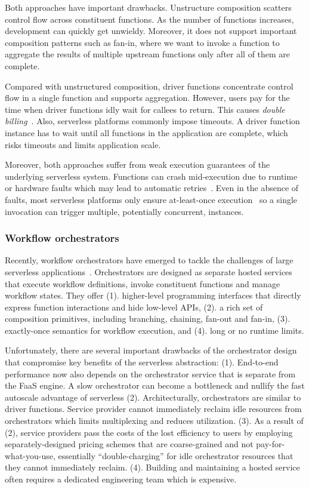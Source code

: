 Both approaches have important drawbacks. Unstructure composition scatters
control flow across constituent functions. As the number of functions
increases, development can quickly get unwieldy. Moreover, it does not support
important composition patterns such as fan-in, where we want to invoke a
function to aggregate the results of multiple upstream functions only after
all of them are complete.

Compared with unstructured composition, driver functions concentrate control
flow in a single function and supports aggregation. However, users pay for the
time when driver functions idly wait for callees to return. This causes
\emph{double billing}~\cite{double-billing}. Also, serverless platforms
commonly impose timeouts. A driver function instance has to wait until all
functions in the application are complete, which risks timeouts and limits
application scale.

Moreover, both approaches suffer from weak execution guarantees of the
underlying serverless system. Functions can crash mid-execution due to runtime
or hardware faults which may lead to automatic retries~\cite{}. Even in the
absence of faults, most serverless platforms only ensure at-least-once
execution~\cite{} so a single invocation can trigger multiple, potentially
concurrent, instances.

\subsubsection{Workflow orchestrators}

Recently, workflow orchestrators have emerged to tackle the challenges of
large serverless applications~\cite{excamera, gg-atc, aws-step-functions,
google-cloud-composer, google-workflows, durable-functions}. Orchestrators are
designed as separate hosted services that execute workflow definitions, invoke
constituent functions and manage workflow states. They offer (1). higher-level
programming interfaces that directly express function interactions and hide
low-level APIs, (2). a rich set of composition primitives, including
branching, chaining, fan-out and fan-in, (3). exactly-once semantics for
workflow execution, and (4). long or no runtime limits.

Unfortunately, there are several important drawbacks of the orchestrator
design that compromise key benefits of the serverless abstraction: (1).
End-to-end performance now also depends on the orchestrator service that is
separate from the FaaS engine. A slow orchestrator can become a bottleneck and
nullify the fast autoscale advantage of serverless (2). Architecturally,
orchestrators are similar to driver functions. Service provider cannot
immediately reclaim idle resources from orchestrators which limits
multiplexing and reduces utilization. (3). As a result of (2), service
providers pass the costs of the lost efficiency to users by employing
separately-designed pricing schemes that are coarse-grained and not
pay-for-what-you-use, essentially ``double-charging'' for idle orchestrator
resources that they cannot immediately reclaim. (4). Building and maintaining
a hosted service often requires a dedicated engineering team which is
expensive.


